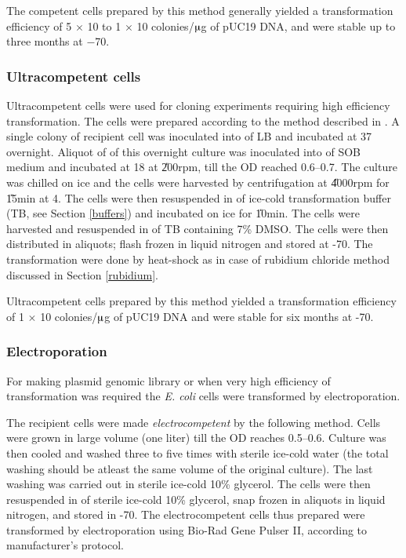 The competent cells prepared by this method generally yielded a
transformation efficiency of 5 $\times$ 10 to 1 $\times$
10 colonies/$\muup$g of pUC19 DNA, and were stable up to
three months at \mbox{$-$70\dg{}}.

\subsubsection{Ultracompetent cells}

Ultracompetent cells were used for cloning experiments requiring
high efficiency transformation. The cells were prepared according
to the method described in \citet{Inoue1990}. A single colony of
 recipient cell was inoculated into  of LB and
incubated at 37\dg{} overnight. Aliquot of  of this
overnight culture was inoculated into  of SOB medium and
incubated at 18\dg{} at \U{200}{rpm}, till the OD reached
0.6--0.7. The culture was chilled on ice and the cells were
harvested by centrifugation at \U{4000}{rpm} for \U{15}{min} at
4\dg{}\@. The cells were then resuspended in  of ice-cold
transformation buffer (TB, see Section \ref{buffers}) and
incubated on ice for \U{10}{min}. The cells were harvested and
resuspended in  of TB containing 7\% DMSO. The cells were
then distributed in  aliquots; flash frozen in liquid
nitrogen and stored at -70\dg{}. The transformation were done by
heat-shock as in case of rubidium chloride method discussed in
Section \ref{rubidium}.

Ultracompetent cells prepared by this method yielded a
transformation efficiency of 1 $\times$ 10 colonies/$\muup$g
of pUC19 DNA and were stable for six months at -70\dg.

\subsubsection{Electroporation}

For making plasmid genomic library  or when very high efficiency
of transformation was required the \textit{E. coli} cells were
transformed by electroporation.

The recipient cells were made \textit{electrocompetent} by the
following method. Cells were grown in large volume (one liter)
till the OD reaches 0.5--0.6. Culture was then cooled and
washed three to five times with sterile ice-cold water (the total
washing should be atleast the same volume of the original
culture). The last washing was carried out in sterile ice-cold
10\% glycerol. The cells were then resuspended in  of
sterile ice-cold 10\% glycerol, snap frozen in  aliquots
in liquid nitrogen, and stored in -70\dg. The electrocompetent
cells thus prepared were transformed by electroporation using
Bio-Rad Gene Pulser{\scriptsize\texttrademark} II, according to
manufacturer's protocol.

